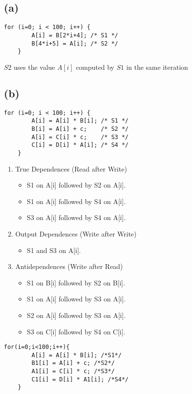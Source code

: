 \documentclass{article}
\begin{document}
\subsection*{(a)}
\begin{lstlisting}[frame=single]
    for (i=0; i < 100; i++) {
        A[i] = B[2*i+4]; /* S1 */
        B[4*i+5] = A[i]; /* S2 */
    }
\end{lstlisting}
$S2$ uses the value \(A[i]\) computed by $S1$ in the same iteration

\subsection*{(b)}
\begin{lstlisting}[frame=single]
    for (i=0; i < 100; i++) {
        A[i] = A[i] * B[i]; /* S1 */
        B[i] = A[i] + c;    /* S2 */
        A[i] = C[i] * c;    /* S3 */
        C[i] = D[i] * A[i]; /* S4 */
    }    
\end{lstlisting}
\begin{enumerate}
    \item True Dependences (Read after Write)
          \begin{itemize}
              \item S1 on A[i] followed by S2 on A[i].
              \item S1 on A[i] followed by S4 on A[i].
              \item S3 on A[i] followed by S4 on A[i].
          \end{itemize}
    \item Output Dependences (Write after Write)
          \begin{itemize}
              \item S1 and S3 on A[i].
          \end{itemize}
    \item Antidependences (Write after Read)
          \begin{itemize}
              \item S1 on B[i] followed by S2 on B[i].
              \item S1 on A[i] followed by S3 on A[i].
              \item S2 on A[i] followed by S3 on A[i].
              \item S3 on C[i] followed by S4 on C[i].
          \end{itemize}
\end{enumerate}
\begin{lstlisting}[frame=single]
    for(i=0;i<100;i++){
        A[i] = A[i] * B[i]; /*S1*/
        B1[i] = A[i] + c; /*S2*/
        A1[i] = C[i] * c; /*S3*/
        C1[i] = D[i] * A1[i]; /*S4*/
    }
\end{lstlisting}
\end{document}
